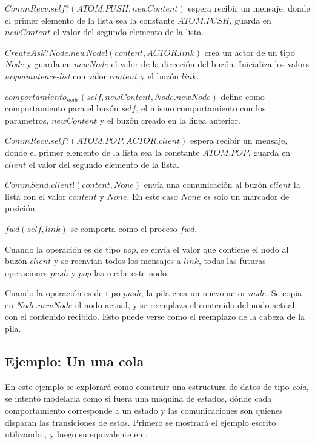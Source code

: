 \begin{description}
 \item $CommRecv.self?(ATOM.PUSH, newContent)$ espera recibir un mensaje, donde el primer elemento de la lista sea la constante $ATOM.PUSH$, guarda en $newContent$ el valor del segundo elemento de la lista.
 \item $CreateAsk?Node.newNode!(content, ACTOR.link)$ crea un actor de un tipo $Node$ y guarda en $newNode$ el valor de la dirección del buzón. Inicializa los valors \textit{acquaiantence-list} con valor $content$ y el buzón $link$.
 \item $comportamiento_{node}(self, newContent, Node.newNode)$ define como comportamiento para el buzón $self$, el mismo comportamiento con los parametros, $newContent$ y el buzón creado en la linea anterior.
 \item $CommRecv.self?(ATOM.POP, ACTOR.client)$ espera recibir un mensaje, donde el primer elemento de la lista sea la constante $ATOM.POP$, guarda en $client$ el valor del segundo elemento de la lista.
 \item $CommSend.client!(content, None)$ envía una comunicación al buzón $client$ la lista con el valor $content$ y $None$. En este caso $None$ es solo un marcador de posición.
 \item $fwd(self, link)$ se comporta como el proceso $fwd$. 
\end{description}

Cuando la operación es de tipo $pop$, se envía el valor que contiene el nodo al buzón $client$ y se reenvían todos los mensajes a $link$, todas las futuras operaciones $push$ y $pop$ las recibe este nodo.

Cuando la operación es de tipo $push$, la pila crea un nuevo actor $node$. Se copia en $Node.newNode$ el nodo actual, y se reemplaza el contenido del nodo actual con el contenido recibido. Esto puede verse como el reemplazo de la cabeza de la pila.

\subsection{Ejemplo: Un una cola}

En este ejemplo se explorará como construir una estructura de datos de tipo \textit{cola}, se intentó modelarla como si fuera una máquina de estados, dónde cada comportamiento corresponde a un estado y las comunicaciones son quienes disparan las transiciones de estos. Primero se mostrará el ejemplo escrito utilizando \SAL, y luego su equivalente en \CSPm.

